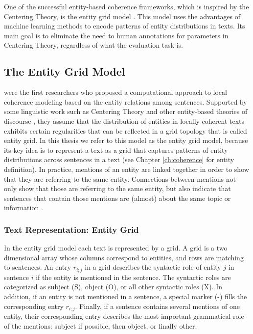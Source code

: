 One of the successful entity-based coherence frameworks, which is inspired by the Centering Theory, is the entity grid model \cite{barzilay05a,barzilay08}. 
This model uses the advantages of machine learning methods to encode patterns of entity distributions in texts.
Its main goal is to eliminate the need to human annotations for parameters in Centering Theory, regardless of what the evaluation task is. 

\subsection{The Entity Grid Model}
\label{sec:rel-ent-grid} 

 were the first researchers who proposed a computational approach to local coherence modeling based on the entity relations among sentences. 
Supported by some linguistic work such as Centering Theory \cite{grosz95} and other entity-based theories of discourse \cite{givon87,prince81a}, they assume that the distribution of entities in locally coherent texts exhibits certain regularities that can be reflected in a grid topology that is called entity grid. 
In this thesis we refer to this model as the entity grid model, because its key idea is to represent a text as a grid that captures patterns of entity distributions across sentences in a text (see Chapter \ref{ch:coherence} for entity definition).  
In practice, mentions of an entity are linked together in order to show that they are referring to the same entity. 
Connections between mentions not only show that those are referring to the same entity, but also indicate that sentences that contain those mentions are (almost) about the same topic or information \cite{barzilay08}. 

\subsubsection{Text Representation: Entity Grid}

In the entity grid model each text is represented by a grid. 
A grid is a two dimensional array whose columns correspond to entities, and rows are matching to sentences.
An entry $r_{i;j}$ in a grid describes the syntactic role of entity $j$ in sentence $i$ if the entity is mentioned in the sentence. 
The syntactic roles are categorized as subject (S), object (O), or all other syntactic roles (X). 
In addition, if an entity is not mentioned in a sentence, a special marker (-) fills the corresponding entry $r_{i;j}$. 
Finally, if a sentence contains several mentions of one entity, their corresponding entry describes the most important grammatical role of the mentions: subject if possible, then object, or finally other. 

